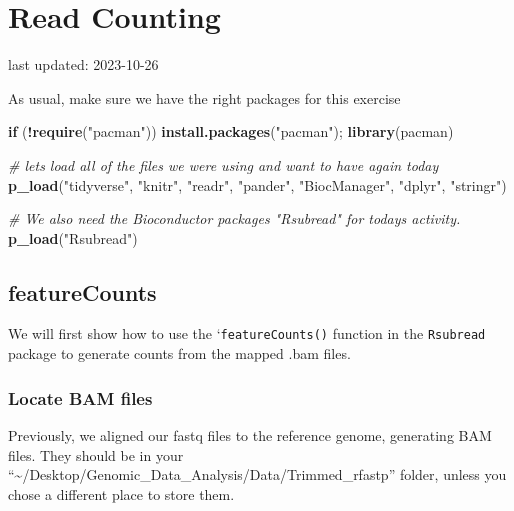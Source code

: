 \documentclass[
]{book}
\newenvironment{Shaded}{\begin{snugshade}}{\end{snugshade}}
\newcommand{\CommentTok}[1]{\textcolor[rgb]{0.56,0.35,0.01}{\textit{#1}}}
\newcommand{\ControlFlowTok}[1]{\textcolor[rgb]{0.13,0.29,0.53}{\textbf{#1}}}
\newcommand{\FunctionTok}[1]{\textcolor[rgb]{0.13,0.29,0.53}{\textbf{#1}}}
\newcommand{\NormalTok}[1]{#1}
\newcommand{\SpecialCharTok}[1]{\textcolor[rgb]{0.81,0.36,0.00}{\textbf{#1}}}
\newcommand{\StringTok}[1]{\textcolor[rgb]{0.31,0.60,0.02}{#1}}
\begin{document}
\hypertarget{read-counting}{%
\chapter{Read Counting}\label{read-counting}}

last updated: 2023-10-26

As usual, make sure we have the right packages for this exercise

\begin{Shaded}
\begin{Highlighting}[]
\ControlFlowTok{if}\NormalTok{ (}\SpecialCharTok{!}\FunctionTok{require}\NormalTok{(}\StringTok{"pacman"}\NormalTok{)) }\FunctionTok{install.packages}\NormalTok{(}\StringTok{"pacman"}\NormalTok{); }\FunctionTok{library}\NormalTok{(pacman)}

\CommentTok{\# let\textquotesingle{}s load all of the files we were using and want to have again today}
\FunctionTok{p\_load}\NormalTok{(}\StringTok{"tidyverse"}\NormalTok{, }\StringTok{"knitr"}\NormalTok{, }\StringTok{"readr"}\NormalTok{,}
       \StringTok{"pander"}\NormalTok{, }\StringTok{"BiocManager"}\NormalTok{, }
       \StringTok{"dplyr"}\NormalTok{, }\StringTok{"stringr"}\NormalTok{)}

\CommentTok{\# We also need the Bioconductor packages "Rsubread" for today\textquotesingle{}s activity.}
\FunctionTok{p\_load}\NormalTok{(}\StringTok{"Rsubread"}\NormalTok{)}
\end{Highlighting}
\end{Shaded}

\hypertarget{featurecounts}{%
\section{featureCounts}\label{featurecounts}}

We will first show how to use the `\texttt{featureCounts()} function in the \texttt{Rsubread} package to generate counts from the mapped .bam files.

\hypertarget{locate-bam-files}{%
\subsection{Locate BAM files}\label{locate-bam-files}}

Previously, we aligned our fastq files to the reference genome, generating BAM files. They should be in your ``\textasciitilde/Desktop/Genomic\_Data\_Analysis/Data/Trimmed\_rfastp'' folder, unless you chose a different place to store them.
\end{document}
